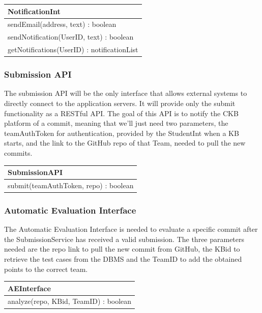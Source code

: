 \documentclass[11pt]{report}
\begin{document}
\begin{longtable}[h] {|p{130mm}|}
\hline
\textbf{NotificationInt} \\ \hline
sendEmail(address, text) : boolean \\
sendNotification(UserID, text) : boolean \\
getNotifications(UserID) : notificationList\\
\hline
\end{longtable}

\subsubsection{Submission API}

The submission API will be the only interface that allows external systems to directly connect to the application servers.
It will provide only the submit functionality as a RESTful API\@.
The goal of this API is to notify the CKB platform of a commit, meaning that we'll just need two parameters,
the teamAuthToken for authentication, provided by the StudentInt when a KB starts, and the link to the GitHub repo of that Team, needed to pull the new commits.

\begin{longtable}[h] {|p{130mm}|}
\hline
\textbf{SubmissionAPI} \\ \hline
submit(teamAuthToken, repo) : boolean \\
\hline
\end{longtable}

\subsubsection{Automatic Evaluation Interface} \label{sec:automatic_evaluation_int}

The Automatic Evaluation Interface is needed to evaluate a specific commit after the SubmissionService has received a valid submission.
The three parameters needed are the repo link to pull the new commit from GitHub, the KBid to retrieve the test cases from the DBMS and the TeamID to add the obtained points to the correct team.

\begin{longtable}[h] {|p{130mm}|}
\hline
\textbf{AEInterface} \\ \hline
analyze(repo, KBid, TeamID) : boolean \\
\hline
\end{longtable}
\end{document}
